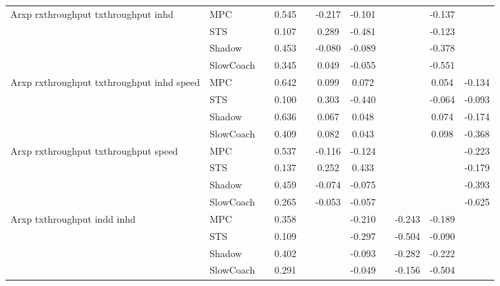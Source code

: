\begin{tabular}{|l|l|*{9}{c|}}
\midrule
Arxp rxthroughput txthroughput inhd    & MPC &       &     0.545 &        & -0.217 & -0.101 &     &      &  -0.137 &       \\
                              & STS &       &     0.107 &        &  0.289 & -0.481 &     &      &  -0.123 &       \\
                              & Shadow &       &     0.453 &        & -0.080 & -0.089 &     &      &  -0.378 &       \\
                              & SlowCoach &       &     0.345 &        &  0.049 & -0.055 &     &      &  -0.551 &       \\
\midrule
Arxp rxthroughput txthroughput inhd speed    & MPC &       &     0.642 &        &  0.099 &  0.072 &     &      &   0.054 &   -0.134 \\
                              & STS &       &     0.100 &        &  0.303 & -0.440 &     &      &  -0.064 &   -0.093 \\
                              & Shadow &       &     0.636 &        &  0.067 &  0.048 &     &      &   0.074 &   -0.174 \\
                              & SlowCoach &       &     0.409 &        &  0.082 &  0.043 &     &      &   0.098 &   -0.368 \\
\midrule
Arxp rxthroughput txthroughput speed    & MPC &       &     0.537 &        & -0.116 & -0.124 &     &      &      &   -0.223 \\
                              & STS &       &     0.137 &        &  0.252 &  0.433 &     &      &      &   -0.179 \\
                              & Shadow &       &     0.459 &        & -0.074 & -0.075 &     &      &      &   -0.393 \\
                              & SlowCoach &       &     0.265 &        & -0.053 & -0.057 &     &      &      &   -0.625 \\
\midrule
Arxp txthroughput indd inhd    & MPC &       &     0.358 &        &     & -0.210 &     &  -0.243 &  -0.189 &       \\
                              & STS &       &     0.109 &        &     & -0.297 &     &  -0.504 &  -0.090 &       \\
                              & Shadow &       &     0.402 &        &     & -0.093 &     &  -0.282 &  -0.222 &       \\
                              & SlowCoach &       &     0.291 &        &     & -0.049 &     &  -0.156 &  -0.504 &       \\

\end{tabular}
